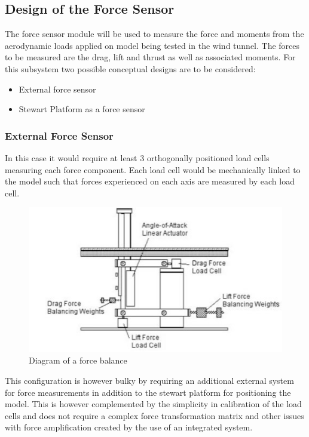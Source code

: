 \subsection{Design of the Force Sensor}
The force sensor module will be used to measure the force and moments from the aerodynamic loads applied on model being tested in the wind tunnel. The forces to be measured are the drag, lift and thrust as well as associated moments. For this subsystem two possible conceptual designs are to be considered:
\begin{itemize}
\item External force sensor
\item Stewart Platform as a force sensor
\end{itemize}
\subsubsection{External Force Sensor}
In this case it would require at least 3 orthogonally positioned load cells measuring each force component. Each load cell would be mechanically linked to the model such that forces experienced on each axis are measured by each load cell. 
\begin{center}
	\begin{figure}[!h]
		\centering
		\includegraphics{Figures/modBal}
		\caption[Diagram of a force balance]{Diagram of a force balance \cite{post_force_2010}}
	\end{figure}
\end{center}
This configuration is however bulky by requiring an additional external system for force measurements in addition to the stewart platform for positioning the model. This is however complemented by the simplicity in calibration of the load cells and does not require a complex force transformation matrix and other issues with force amplification created by the use of an integrated system.
